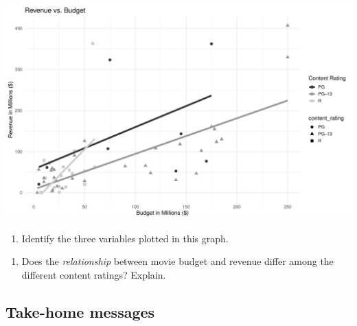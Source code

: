\documentclass[
]{report}
\providecommand{\tightlist}{%
  \setlength{\itemsep}{0pt}\setlength{\parskip}{0pt}}
\begin{document}
\begin{center}\includegraphics[width=0.7\linewidth]{05-EDA-multivariate_files/figure-latex/unnamed-chunk-5-1} \end{center}

\begin{enumerate}
\def\labelenumi{\arabic{enumi}.}
\setcounter{enumi}{3}
\tightlist
\item
  Identify the three variables plotted in this graph.
\end{enumerate}

\vspace{0.5in}

\begin{enumerate}
\def\labelenumi{\arabic{enumi}.}
\setcounter{enumi}{4}
\tightlist
\item
  Does the \emph{relationship} between movie budget and revenue differ among the different content ratings? Explain.
\end{enumerate}

\vspace{1in}

\hypertarget{take-home-messages-4}{%
\subsection{Take-home messages}\label{take-home-messages-4}}
\end{document}
